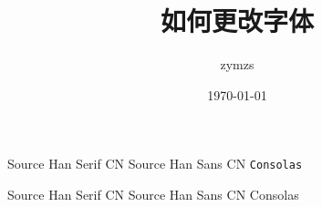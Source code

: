 \documentclass{ctexart}
\title{如何更改字体}
\author{zymzs}
\date{\today}
\begin{document}
	\maketitle
	
	\textrm{Source Han Serif CN}	\textsf{Source Han Sans CN} \texttt{Consolas}

	\rmfamily Source Han Serif CN	 {\sffamily Source Han Sans CN} {\ttfamily Consolas}
\end{document}
